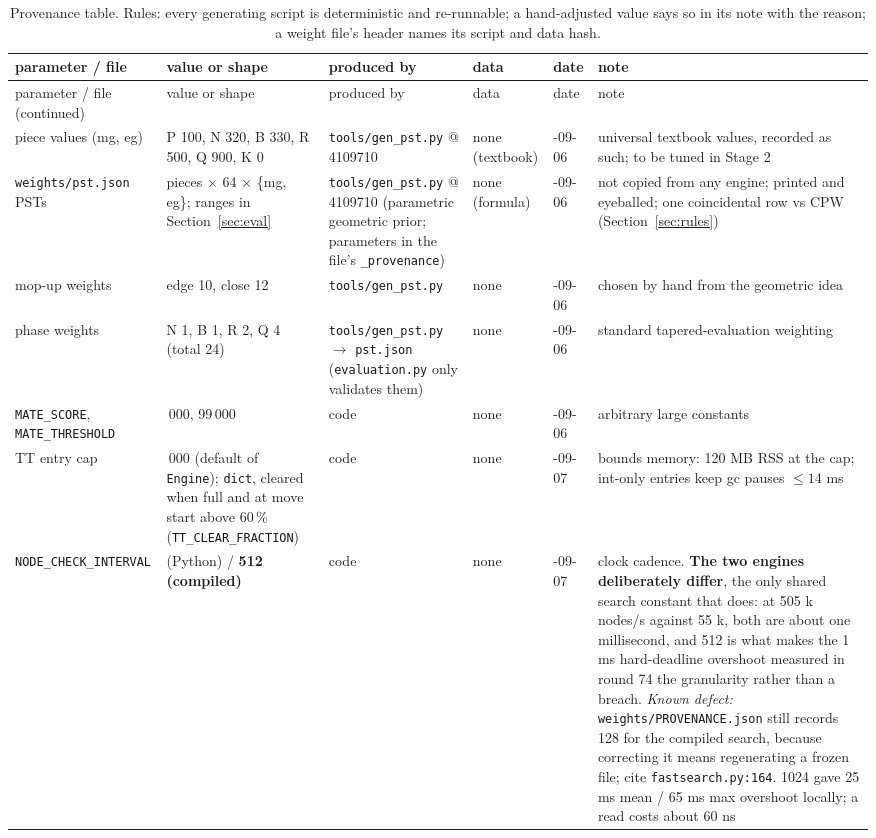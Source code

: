 \documentclass[11pt,a4paper]{article}
\newcommand{\code}[1]{\texttt{#1}}
\begin{document}
{\footnotesize
\begin{longtable}{@{}>{\raggedright\arraybackslash}p{3.4cm}>{\raggedright\arraybackslash}p{2.9cm}>{\raggedright\arraybackslash}p{2.6cm}>{\raggedright\arraybackslash}p{1.3cm}>{\raggedright\arraybackslash}p{1.8cm}>{\raggedright\arraybackslash}p{2.3cm}@{}}
\caption{Provenance table. Rules: every generating script is deterministic and re-runnable; a
hand-adjusted value says so in its note with the reason; a weight file's header names its script and data
hash.}\label{tab:provenance}\\
\toprule
parameter / file & value or shape & produced by & data & date & note \\
\midrule
\endfirsthead
\toprule
parameter / file (continued) & value or shape & produced by & data & date & note \\
\midrule
\endhead
\bottomrule
\endlastfoot
piece values (mg, eg) & P 100, N 320, B 330, R 500, Q 900, K 0 & \code{tools/gen\_pst.py} @ 4109710 & none (textbook) & 2026-09-06 & universal textbook values, recorded as such; to be tuned in Stage 2 \\
\code{weights/pst.json} PSTs & 6 pieces $\times$ 64 $\times$ \{mg, eg\}; ranges in Section~\ref{sec:eval} & \code{tools/gen\_pst.py} @ 4109710 (parametric geometric prior; parameters in the file's \code{\_provenance}) & none (formula) & 2026-09-06 & not copied from any engine; printed and eyeballed; one coincidental row vs CPW (Section~\ref{sec:rules}) \\
mop-up weights & edge 10, close 12 & \code{tools/gen\_pst.py} & none & 2026-09-06 & chosen by hand from the geometric idea \\
phase weights & N 1, B 1, R 2, Q 4 (total 24) & \code{tools/gen\_pst.py} $\to$ \code{pst.json} (\code{evaluation.py} only validates them) & none & 2026-09-06 & standard tapered-evaluation weighting \\
\code{MATE\_SCORE}, \code{MATE\_THRESHOLD} & 100\,000, 99\,000 & code & none & 2026-09-06 & arbitrary large constants \\
TT entry cap & 250\,000 (default of \code{Engine}); \code{dict}, cleared when full and at move start above 60\,\% (\code{TT\_CLEAR\_FRACTION}) & code & none & 2026-09-07 & bounds memory: 120 MB RSS at the cap; int-only entries keep gc pauses $\leq 14$ ms \\
\code{NODE\_CHECK\_INTERVAL} & 128 (Python) / \textbf{512 (compiled)} & code & none & 2026-09-07 & clock cadence. \textbf{The two engines deliberately differ}, the only shared search constant that does: at 505 k nodes/s against 55 k, both are about one millisecond, and 512 is what makes the 1 ms hard-deadline overshoot measured in round 74 the granularity rather than a breach. \emph{Known defect:} \code{weights/PROVENANCE.json} still records 128 for the compiled search, because correcting it means regenerating a frozen file; cite \code{fastsearch.py:164}. 1024 gave 25 ms mean / 65 ms max overshoot locally; a read costs about 60 ns \\

\end{longtable}}
\end{document}
